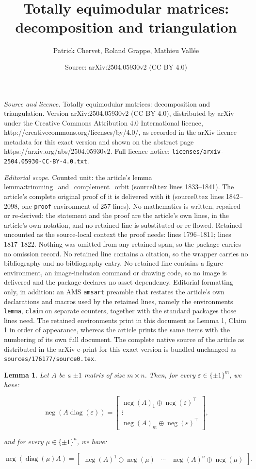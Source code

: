 \documentclass[10pt,a4paper]{amsart}
\title{Totally equimodular matrices: decomposition and triangulation}
\author{Patrick Chervet, Roland Grappe, Mathieu Vall\'ee}
\date{Source: arXiv:2504.05930v2 (CC BY 4.0)}
\newtheorem{lemma}{Lemma}
\DeclareMathOperator{\diag}{diag}
\DeclareMathOperator{\nega}{neg}
\begin{document}
\maketitle

\noindent\emph{Source and licence.} Totally equimodular matrices: decomposition and triangulation. Version arXiv:2504.05930v2 (CC BY 4.0), distributed by arXiv under the Creative Commons Attribution 4.0 International licence, http://creativecommons.org/licenses/by/4.0/, as recorded in the arXiv licence metadata for this exact version and shown on the abstract page https://arxiv.org/abs/2504.05930v2. Full licence notice: \texttt{licenses/arxiv-2504.05930-CC-BY-4.0.txt}.\par\smallskip

\noindent\textit{Editorial scope.} Counted unit: the article's lemma lemma:trimming\_and\_complement\_orbit (source0.tex lines 1833--1841). The article's complete original proof of it is delivered with it (source0.tex lines 1842--2098, one \texttt{proof} environment of 257 lines). No mathematics is written, repaired or re-derived: the statement and the proof are the article's own lines, in the article's own notation, and no retained line is substituted or re-flowed.  Retained uncounted as the source-local context the proof needs: lines 1796--1811; lines 1817--1822.  Nothing was omitted from any retained span, so the package carries no omission record.  No retained line contains a citation, so the wrapper carries no bibliography and no bibliography entry.  No retained line contains a figure environment, an image-inclusion command or drawing code, so no image is delivered and the package declares no asset dependency.  Editorial formatting only, in addition: an AMS \texttt{amsart} preamble that restates the article's own declarations and macros used by the retained lines, namely the environments \texttt{lemma}, \texttt{claim} on separate counters, together with the standard packages those lines need.  The retained environments print in this document as Lemma 1, Claim 1 in order of appearance, whereas the article prints the same items with the numbering of its own full document.  The complete native source of the article as distributed in the arXiv e-print for this exact version is bundled unchanged as \texttt{sources/176177/source0.tex}.
\begin{lemma}\label{lemma:correspondence_sign}
Let $A$ be a $\pm1$ matrix of size $m\times n$. Then, for every $\varepsilon \in \{\pm1\}^m$, we have:

$$\nega{(A\diag(\varepsilon))} =\begin{bmatrix}
\nega{(A)}_1 \oplus \nega{(\varepsilon)}^\top\\
\vdots \\
\nega{(A)}_m \oplus \nega{(\varepsilon)}^\top
\end{bmatrix},$$

and for every $\mu \in \{\pm1\}^n$, we have:

$$\nega{(\diag(\mu)A)} =\begin{bmatrix}
\nega{(A)}^1 \oplus \nega{(\mu)} &\cdots &
\nega{(A)}^n \oplus \nega{(\mu)}
\end{bmatrix}.$$
\end{lemma}
\end{document}
